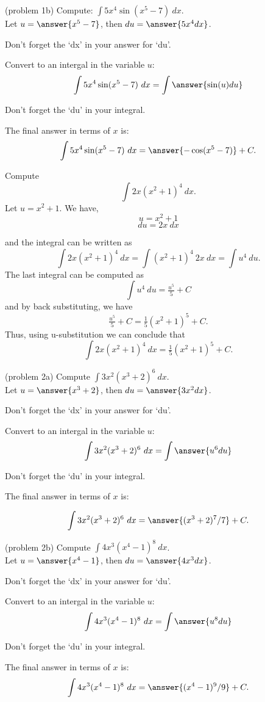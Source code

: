 \documentclass{ximera}
\begin{document}
\begin{problem}(problem 1b) Compute: $\displaystyle{\int 5x^4\sin(x^5 -7) \ dx}$.\\
Let $u = \answer{x^5 - 7}$, then $du = \answer{5x^4 dx}$.\\
\begin{hint}
Don't forget the `dx' in your answer for `du'.
\end{hint}
Convert to an intergal in the variable $u$:
\[\int 5x^4\sin(x^5 -7) \ dx = \int\answer{\sin(u) du}\]
\begin{hint}
Don't forget the `du' in your integral.
\end{hint}
The final answer in terms of $x$ is:
\[\int 5x^4\sin(x^5 -7) \ dx = \answer{-\cos(x^5 -7)} +C.\]
\end{problem}


\begin{example}[example 2] Compute 
\[\int 2x(x^2 + 1)^4 \ dx.\]
Let $u = x^2 + 1$.  We have,
\[u = x^2 + 1\]
\[du = 2x \ dx\]

and the integral can be written as 
\[\int 2x(x^2 + 1)^4 \ dx = \int (x^2 + 1)^4 \ 2x \  dx = \int u^4 \ du.\]
The last integral can be computed as 
\[\int u^4 \ du = \tfrac{u^5}{5} + C\]
and by back substituting, we have 
\[\tfrac{u^5}{5} + C = \tfrac15(x^2 + 1)^5 + C .\]
Thus, using u-substitution we can conclude that
\[\int 2x(x^2 + 1)^4 \ dx  =  \tfrac15(x^2 + 1)^5 + C .\]
\end{example}

\begin{problem}(problem 2a) Compute $\displaystyle{\int 3x^2(x^3 + 2)^6 \ dx}$.\\
Let $u = \answer{x^3 + 2}$, then $du = \answer{3x^2 dx}$.\\
\begin{hint}
Don't forget the `dx' in your answer for `du'.
\end{hint}
Convert to an intergal in the variable $u$:
\[\int 3x^2(x^3 + 2)^6 \ dx = \int\answer{u^6 du}\]
\begin{hint}
Don't forget the `du' in your integral.
\end{hint}
The final answer in terms of $x$ is:

\[\int 3x^2(x^3 + 2)^6 \ dx = \answer{(x^3 + 2)^7/7} +C.\]
\end{problem}

\begin{problem}(problem 2b) Compute $\displaystyle{\int 4x^3(x^4 -1)^8 \ dx}$.\\
Let $u = \answer{x^4 -1}$, then $du = \answer{4x^3 dx}$.\\
\begin{hint}
Don't forget the `dx' in your answer for `du'.
\end{hint}
Convert to an intergal in the variable $u$:
\[\int 4x^3(x^4 -1)^8 \ dx = \int\answer{u^8 du}\]
\begin{hint}
Don't forget the `du' in your integral.
\end{hint}
The final answer in terms of $x$ is:
\[\int 4x^3(x^4 -1)^8 \ dx = \answer{(x^4 -1)^9/9} +C.\]
\end{problem}
\end{document}
